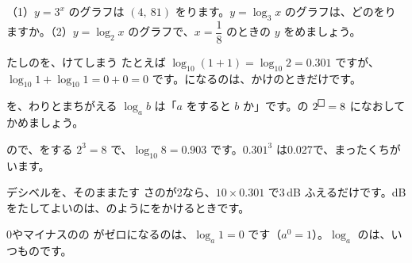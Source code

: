 \begin{jibun}
（1）$y=3^x$ のグラフは $(4,\ 81)$ をります。$y=\log_3x$ のグラフは、どのをりますか。（2）$y=\log_2x$ のグラフで、$x=\dfrac{1}{8}$ のときの $y$ をめましょう。
\end{jibun}

\label{bk:3-12:tsuma}

\begin{tsumazuki}{たしのを、けてしまう}
たとえば $\log_{10}(1+1)=\log_{10}2=0.301$ ですが、$\log_{10}1+\log_{10}1=0+0=0$ です。になるのは、かけのときだけです。
\end{tsumazuki}

\begin{tsumazuki}{を、わりとまちがえる}
$\log_ab$ は「$a$ をすると $b$ か」です。の $2^{\bkthrmbox}=8$ になおしてかめましょう。
\end{tsumazuki}

\begin{tsumazuki}{ので、をする}
$2^3=8$ で、$\log_{10}8=0.903$ です。$0.301^3$ は0.027で、まったくちがいます。
\end{tsumazuki}

\begin{tsumazuki}{デシベルを、そのままたす}
さのが2なら、$10\times0.301$ で3\,dB ふえるだけです。dB をたしてよいのは、のようにをかけるときです。
\end{tsumazuki}

\begin{tsumazuki}{0やマイナスのの}
がゼロになるのは、$\log_a1=0$ です（$a^0=1$）。$\log_a$ のは、いつものです。
\end{tsumazuki}

